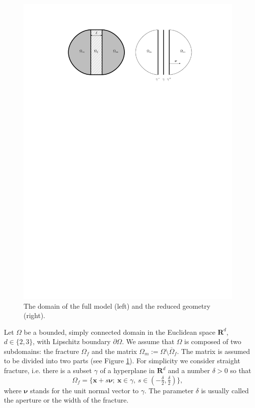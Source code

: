 \documentclass[a4paper]{article}
\def\nnu{\vc\nu}
\def\Real{{\mathbf R}}
\def\vc#1{\mathbf{\boldsymbol{#1}}}     %
\def\xx{\vc x}
\newcommand{\eq}[1]{\begin{equation}#1\end{equation}}
\begin{document}
\begin{figure}[h]
\centering
\includegraphics[width=\textwidth]{figures/omegas}
\caption{The domain of the full model (left) and the reduced geometry (right).}
\label{fig:omegas}
\end{figure}

Let $\Omega$ be a bounded, simply connected domain in the Euclidean space $\Real^d$, $d\in\{2,3\}$, with Lipschitz boundary $\partial\Omega$.
We assume that $\Omega$ is composed of two subdomains: the fracture $\Omega_f$ and the matrix $\Omega_m:=\Omega\setminus\overline\Omega_f$.
The matrix is assumed to be divided into two parts (see Figure \ref{fig:omegas}).
For simplicity we consider straight fracture, i.e. there is a subset $\gamma$ of a hyperplane in $\Real^d$ and a number $\delta>0$ so that
\eq{ \Omega_f = \{\xx+s\nnu;~\xx\in\gamma,~s\in(-\tfrac\delta2,\tfrac\delta2)\}, }
where $\nnu$ stands for the unit normal vector to $\gamma$.
The parameter $\delta$ is usually called the aperture or the width of the fracture.
\end{document}
